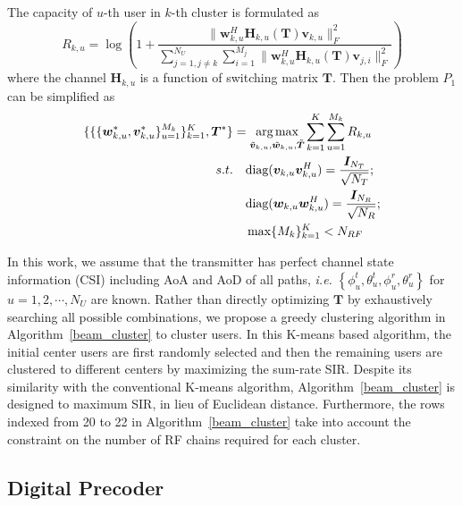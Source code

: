 \documentclass[conference]{IEEEtran}
\def\argmax{\mathop{\mbox{arg\,max}}}
\begin{document}
{The	capacity of $u$-th user in $k$-th cluster is formulated as
\begin{equation}
R_{k,u} = \log\left(1+\frac{\|\bm{w}^H_{k,u} \bm{H}_{k,u}(\bm{T}) \bm{v}_{k,u}\|_F^2}{\sum_{j=1,j\neq k}^{N_U}\sum_{i=1}^{M_j}\|\bm{w}^H_{k,u} \bm{H}_{k,u}(\bm{T}) \bm{v}_{j,i}\|_F^2}\right)
\end{equation}
where the channel $\bm{H}_{k,u}$ is a function of switching matrix $\bm{T}$. Then the problem $P_1$ can be simplified as
\begin{align}\label{eq:group-scheduling}
\{\{\{\bm{w}^*_{k,u}, \bm{v}^*_{k,u}\}_{u=1}^{M_k}\}_{k=1}^{K},\bm{T}^*\} &= \argmax_{\tilde{\bm{v}}_{k,u},\tilde{\bm{w}}_{k,u},\tilde{\bm{T}}} \sum_{k=1}^{K}\sum_{u=1}^{M_k} R_{k,u}  \\ \nonumber
s.t. &\quad \text{diag}(\bm{v}_{k,u}\bm{v}_{k,u}^H)=\frac{\bm{I}_{N_T}}{\sqrt{N_T}};\\
& \quad\text{diag}(\bm{w}_{k,u}\bm{w}_{k,u}^H)=\frac{\bm{I}_{N_{R}}}{\sqrt{N_R}};\nonumber\\
&\quad \max\{M_k\}_{k=1}^K<N_{RF}\nonumber
\end{align}

In this work, we assume that the transmitter has perfect channel state information (CSI) including AoA and AoD of all paths, {\em i.e.} $\left\{\phi^t_u,\theta^t_u,\phi^r_u,\theta^r_u\right\}$ for $u=1,2,\cdots,N_U$ are known. Rather than directly optimizing $\bm{T}$ by exhaustively searching all possible combinations, we propose a greedy clustering algorithm in Algorithm~\ref{beam_cluster} to cluster users. In this K-means based algorithm, the initial center users are first randomly selected and then the remaining users are clustered to different centers by maximizing the sum-rate SIR. Despite its similarity with the conventional K-means algorithm, Algorithm~\ref{beam_cluster} is designed to maximum SIR, in lieu of Euclidean distance. Furthermore, the rows indexed from 20 to 22 in Algorithm~\ref{beam_cluster} take into account the constraint on the number of RF chains required for each cluster.


\subsection{Digital Precoder}

}
\end{document}
